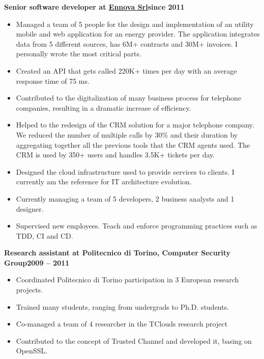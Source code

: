 \documentclass[a4paper,sans,10pt]{moderncv} %
\begin{document}
\renewcommand{\labelitemi}{\tiny$\blacksquare$}
\textbf{Senior software developer at \href{https://www.ennova.it}{Ennova Srl}}\hfill\textbf{since 2011}\\
\vspace{-1em}
  \begin{itemize}
  \item Managed a team of 5 people for the design and implementation of an utility mobile and web application for an energy provider.
  The application integrates data from 5 different sources, has 6M+ contracts and 30M+ invoices.
  I personally wrote the most critical parts.
  \item Created an API that gets called 220K+ times per day with an average response time of 75 ms.
  \item Contributed to the digitalization of many business process for telephone companies, resulting in a dramatic
  increase of efficiency.
  \item Helped to the redesign of the CRM solution for a major telephone company. We reduced the number of multiple calls by 30\%
  and their duration by aggregating together all the previous tools that the CRM agents used. The CRM is used by 350+ users and handles 3.5K+ tickets per day.
  \item Designed the cloud infrastructure used to provide services to clients. I currently am the reference for IT architecture evolution.
  \item Currently managing a team of 5 developers, 2 business analysts and 1 designer.
  \item Supervised new employees. Teach and enforce programming practices such as TDD, CI and CD.
  \end{itemize}

\vspace{0.5em}
  \textbf{Research assistant at Politecnico di Torino, Computer Security Group}\hfill\textbf{2009 -- 2011}\\
\vspace{-1em}
  \begin{itemize}
  \item Coordinated Politecnico di Torino participation in 3 European research projects.
  \item Trained many students, ranging from undergrads to Ph.D. students.
  \item Co-managed a team of 4 researcher in the TClouds research project%
  \item Contributed to the concept of Trusted Channel and developed it, basing on OpenSSL.
  \end{itemize}
\end{document}
